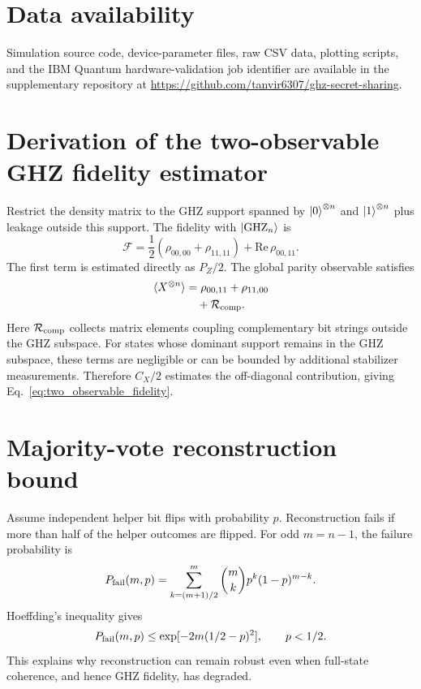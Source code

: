 \documentclass[aip,amsmath,amssymb,reprint,longbibliography]{revtex4-2}
\newcommand{\ghz}{\mathrm{GHZ}}
\newcommand{\fid}{\mathcal{F}}
\newcommand{\ketzero}{\ket{0}^{\otimes n}}
\newcommand{\ketone}{\ket{1}^{\otimes n}}
\begin{document}
\section*{Data availability}
Simulation source code, device-parameter files, raw CSV data, plotting scripts, and the IBM Quantum hardware-validation job identifier are available in the supplementary repository at \url{https://github.com/tanvir6307/ghz-secret-sharing}.

\appendix

\section{Derivation of the two-observable GHZ fidelity estimator}
\label{app:fidelity_estimator}

Restrict the density matrix to the GHZ support spanned by $\ketzero$ and $\ketone$ plus leakage outside this support.  The fidelity with $\ket{\ghz_n}$ is
\begin{equation}
\fid=\frac{1}{2}\left(\rho_{00,00}+\rho_{11,11}\right)+\mathrm{Re}\,\rho_{00,11}.
\end{equation}
The first term is estimated directly as $P_Z/2$.  The global parity observable satisfies
\begin{equation}
\begin{aligned}
\langle X^{\otimes n}\rangle
&=\rho_{00,11}+\rho_{11,00}\\
&\quad+\mathcal{R}_{\rm comp}.
\end{aligned}
\end{equation}
Here $\mathcal{R}_{\rm comp}$ collects matrix elements coupling complementary bit strings outside the GHZ subspace.  For states whose dominant support remains in the GHZ subspace, these terms are negligible or can be bounded by additional stabilizer measurements.  Therefore $C_X/2$ estimates the off-diagonal contribution, giving Eq.~\eqref{eq:two_observable_fidelity}.

\section{Majority-vote reconstruction bound}
\label{app:majority_bound}

Assume independent helper bit flips with probability $p$.  Reconstruction fails if more than half of the helper outcomes are flipped.  For odd $m=n-1$, the failure probability is
\begin{equation}
P_{\rm fail}(m,p)=\sum_{k=(m+1)/2}^{m}\binom{m}{k}p^k(1-p)^{m-k}.
\end{equation}
Hoeffding's inequality gives
\begin{equation}
P_{\rm fail}(m,p)\leq \exp[-2m(1/2-p)^2],\qquad p<1/2.
\end{equation}
This explains why reconstruction can remain robust even when full-state coherence, and hence GHZ fidelity, has degraded.



\end{document}
